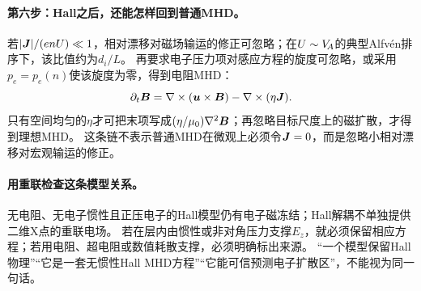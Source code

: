 \paragraph{第六步：Hall之后，还能怎样回到普通MHD。}
若$|\bm{J}|/(enU)\ll1$，相对漂移对磁场输运的修正可忽略；在$U\sim V_{\!A}$的典型Alfvén排序下，该比值约为$d_i/L$。
再要求电子压力项对感应方程的旋度可忽略，或采用$p_e=p_e(n)$使该旋度为零，得到电阻MHD：
\begin{equation}
 \partial_t\bm{B}=\nabla\times(\bm{u}\times\bm{B})-\nabla\times(\eta\bm{J}).
\end{equation}
只有空间均匀的$\eta$才可把末项写成$(\eta/\mu_0)\nabla^2\bm{B}$；再忽略目标尺度上的磁扩散，才得到理想MHD。
这条链不表示普通MHD在微观上必须令$\bm{J}=0$，而是忽略小相对漂移对宏观输运的修正。

\paragraph{用重联检查这条模型关系。}
无电阻、无电子惯性且正压电子的Hall模型仍有电子磁冻结；Hall解耦不单独提供二维X点的重联电场。
若在层内由惯性或非对角压力支撑$E_z$，就必须保留相应方程；若用电阻、超电阻或数值耗散支撑，必须明确标出来源。
“一个模型保留Hall物理”“它是一套无惯性Hall MHD方程”“它能可信预测电子扩散区”，不能视为同一句话。\citep{Wang2015,Birn2001}
